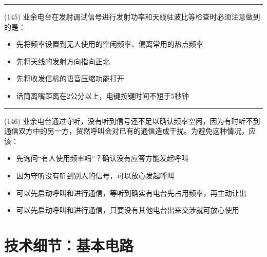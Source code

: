 \documentclass[twocolumn,hyperref,UTF8]{ctexart}  %
\begin{document}
\noindent\rule{0.5\textwidth}{1pt}
\heiti (145) 业余电台在发射调试信号进行发射功率和天线驻波比等检查时必须注意做到的是： \songti {\color{gray} [LK0233] }
\begin{itemize}
	\item  先将频率设置到无人使用的空闲频率、偏离常用的热点频率
	\item  先将天线的发射方向指向正北
	\item  先将收发信机的语音压缩功能打开
	\item  话筒离嘴距离在2公分以上，电键按键时间不短于5秒钟
\end{itemize}


\noindent\rule{0.5\textwidth}{1pt}
\heiti (146) 业余电台通过守听，没有听到信号还不足以确认频率空闲，因为有时听不到通信双方中的另一方，贸然呼叫会对已有的通信造成干扰。为避免这种情况，应该： \songti {\color{gray} [LK0235] }
\begin{itemize}
	\item  先询问“有人使用频率吗”？确认没有应答方能发起呼叫
	\item  因为守听没有听到别人的信号，可以放心发起呼叫
	\item  可以先启动呼叫和进行通信，等听到确实有电台先占用频率，再主动让出
	\item  可以先启动呼叫和进行通信，只要没有其他电台出来交涉就可放心使用
\end{itemize}





















\clearpage
\section{技术细节：基本电路}









\end{document}

